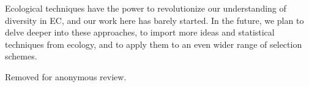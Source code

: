 Ecological techniques have the power to revolutionize our understanding of diversity in EC, and our work here has barely %
started. In the future, we plan to delve deeper into these approaches, to import more ideas and statistical techniques from ecology, and to apply them to an even wider range of selection schemes.

\begin{acks}
Removed for anonymous review.
\end{acks}





